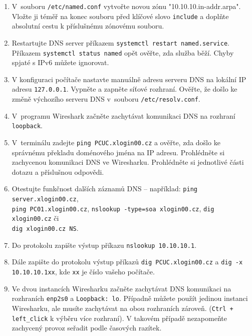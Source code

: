 \begin{enumerate}
  \item V~souboru {\tt /etc/named.conf} vytvořte novou zónu "10.10.10.in-addr.arpa". Vložte ji téměř na konec souboru před klíčové slovo {\tt include} a doplňte absolutní cestu k příslušnému zónovému souboru.
  
  \item Restartujte DNS server příkazem {\tt systemctl restart named.service}.
    Příkazem {\tt systemctl status named} opět ověřte, zda služba běží. Chyby spjaté s IPv6 můžete ignorovat.

  \item V konfiguraci počítače nastavte manuálně adresu serveru DNS na lokální IP adresu {\tt 127.0.0.1}. Vypněte a zapněte síťové rozhraní. Ověřte, že došlo ke změně výchozího serveru DNS v~souboru {\tt /etc/resolv.conf}.
  \item V~programu Wireshark začněte zachytávat  komunikaci DNS na rozhraní {\tt loopback}.
  \item V~terminálu zadejte {\tt ping PCUC.xlogin00.cz} a ověřte, zda došlo ke správnému překladu doménového jména na IP adresu. Prohlédněte si zachycenou komunikaci DNS ve Wiresharku. Prohlédněte si jednotlivé části dotazu a příslušnou odpovědi.
  \item Otestujte funkčnost dalších záznamů DNS -- například:  {\tt ping server.xlogin00.cz},\\
    {\tt ping PC01.xlogin00.cz}, {\tt nslookup -type=soa xlogin00.cz}, {\tt dig xlogin00.cz} či \\
    {\tt dig xlogin00.cz NS}. 
  \item Do protokolu zapište výstup příkazu {\tt nslookup 10.10.10.1}.
  \item Dále zapište do protokolu výstup příkazů {\tt dig PCUC.xlogin00.cz} a {\tt dig -x 10.10.10.1xx}, kde {\tt xx} je číslo vašeho počítače.
  \item Ve dvou instancích Wiresharku začněte zachytávat DNS komunikaci na rozhraních {\tt enp2s0} a {\tt Loopback: lo}. Případně můžete použít jedinou instanci Wiresharku, ale musíte zachytávat na obou rozhraních zároveň. (\texttt{Ctrl + left\_click} k výběru více rozhraní). V takovém případě nezapomeňte zachycený provoz seřadit podle časových razítek.
  

\end{enumerate}
